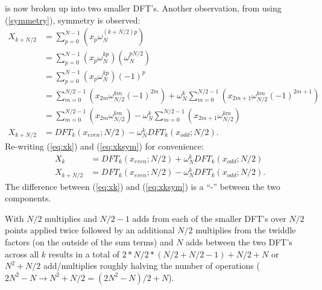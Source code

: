 \documentclass{article}
\begin{document}
%
is now broken up into two smaller DFT's.
Another observation, from using (\ref{symmetry}), symmetry is observed:
%
\begin {equation} \label {eq:xksym}
\begin {aligned}
X_{k + N/2} &= \sum_{p = 0}^{N-1} (x_p \omega_N^{(k + N/2) p}) \\
            &= \sum_{p = 0}^{N-1} (x_p \omega_N^{k p}) (\omega_N^{p N/2}) \\
            &= \sum_{p = 0}^{N-1} (x_p \omega_N^{k p}) (-1)^p \\
            &= \sum_{m = 0}^{N/2-1} (x_{2m} \omega_{N/2}^{k m} (-1)^{2m}) + \omega_N^{k} \sum_{m = 0}^{N/2-1} (x_{2m+1} \omega_{N/2}^{km} (-1)^{2m+1}) \\
            &= \sum_{m = 0}^{N/2-1} (x_{2m} \omega_{N/2}^{k m}) - \omega_N^{k} \sum_{m = 0}^{N/2-1} (x_{2m+1} \omega_{N/2}^{km}) \\
X_{k + N/2} &= DFT_k(x_{even}; N/2) - \omega_N^{k} DFT_k(x_{odd}; N/2).
\end {aligned}
\end {equation}
%
Re-writing (\ref{eq:xk}) and (\ref{eq:xksym}) for convenience:
%
\begin {equation}
\begin {aligned}
&X_k         &= DFT_k(x_{even}; N/2) + \omega_N^{k} DFT_k(x_{odd}; N/2) \\
&X_{k + N/2} &= DFT_k(x_{even}; N/2) - \omega_N^{k} DFT_k(x_{odd}; N/2).
\end {aligned}
\end {equation}
%
The difference between (\ref{eq:xk}) and (\ref{eq:xksym}) is a ``-'' between the two components.

With $N/2$ multiplies and $N/2 - 1$ adds from each of the smaller DFT's over $N/2$ points applied twice followed by an additional $N/2$ multiplies from the twiddle factors (on the outside of the sum terms) and $N$ adds between the two DFT's across all $k$ results in a total of $2 * N/2 * (N/2 + N/2 - 1) + N/2 + N$ or $N^2 + N/2$ add/multiplies roughly halving the number of operations ($2 N^2 - N \rightarrow N^2 + N/2 = (2 N^2 - N) / 2 + N$).
\end{document}

